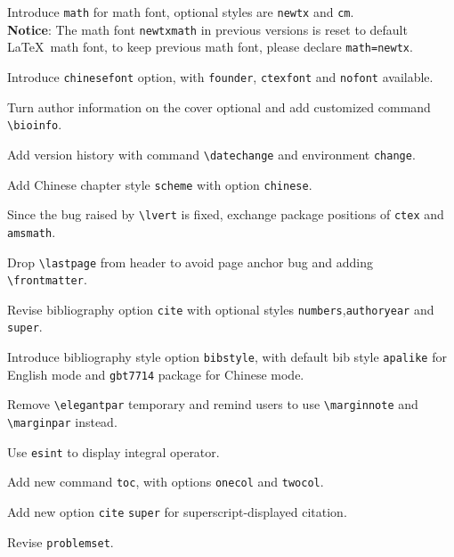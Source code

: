 \documentclass[11pt]{elegantbook}
\begin{document}
\begin{change}
  \item Introduce \lstinline{math} for math font, optional styles are \lstinline{newtx} and \lstinline{cm}.\\
  \textbf{Notice}: The math font \lstinline{newtxmath} in previous versions is reset to default \LaTeX\ math font, to keep previous math font, please declare \lstinline{math=newtx}.
  \item Introduce \lstinline{chinesefont} option, with \lstinline{founder}, \lstinline{ctexfont} and \lstinline{nofont} available.
  \item Turn author information on the cover optional and add customized command \lstinline{\bioinfo}.
  \item Add version history with command \lstinline{\datechange} and environment \lstinline{change}.
  \item Add Chinese chapter style \lstinline{scheme} with option \lstinline{chinese}.
  \item Since the bug raised by \lstinline{\lvert} is fixed, exchange package positions of \lstinline{ctex} and \lstinline{amsmath}.
  \item Drop \lstinline{\lastpage} from header to avoid page anchor bug and adding \lstinline{\frontmatter}.
  \item Revise bibliography option \lstinline{cite} with optional styles \lstinline{numbers},\lstinline{authoryear} and \lstinline{super}.
  \item Introduce bibliography style option \lstinline{bibstyle}, with default bib style \lstinline{apalike} for English mode and \lstinline{gbt7714} package for Chinese mode.
\end{change}


\begin{change}
  \item Remove \lstinline{\elegantpar} temporary and remind users to use \lstinline{\marginnote} and \lstinline{\marginpar} instead.
  \item Use \lstinline{esint} to display integral operator.
  \item Add new command \lstinline{toc}, with options  \lstinline{onecol} and \lstinline{twocol}.
  \item Add new option \lstinline{cite} \lstinline{super} for superscript-displayed citation.
  \item Revise \lstinline{problemset}.
\end{change}
\end{document}
